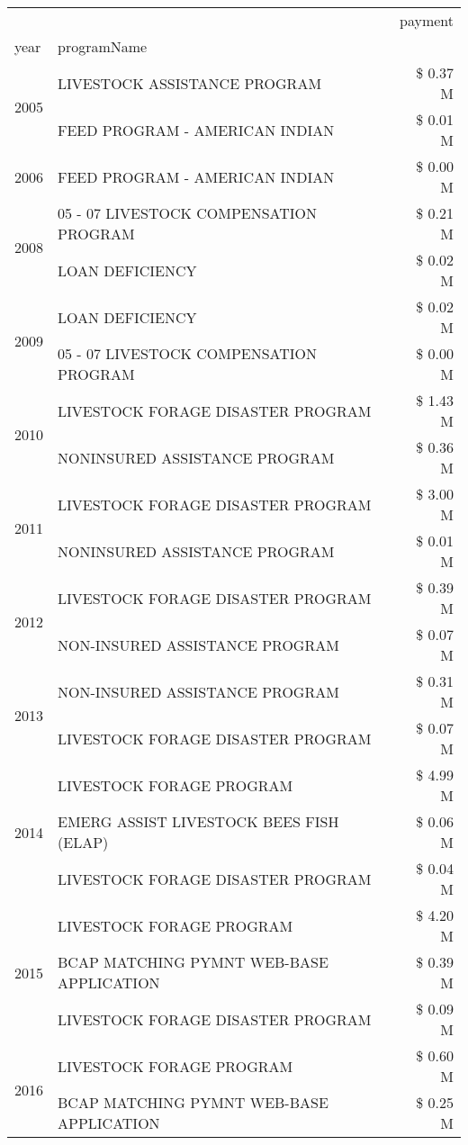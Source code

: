 \begin{tabular}{llr}
\toprule
 &  & payment \\
year & programName &  \\
\midrule
\multirow[t]{2}{*}{2005} & LIVESTOCK ASSISTANCE PROGRAM & \$ 0.37 M \\
 & FEED PROGRAM - AMERICAN INDIAN & \$ 0.01 M \\
\cline{1-3}
2006 & FEED PROGRAM - AMERICAN INDIAN & \$ 0.00 M \\
\cline{1-3}
\multirow[t]{2}{*}{2008} & 05 - 07 LIVESTOCK COMPENSATION PROGRAM & \$ 0.21 M \\
 & LOAN DEFICIENCY & \$ 0.02 M \\
\cline{1-3}
\multirow[t]{2}{*}{2009} & LOAN DEFICIENCY & \$ 0.02 M \\
 & 05 - 07 LIVESTOCK COMPENSATION PROGRAM & \$ 0.00 M \\
\cline{1-3}
\multirow[t]{2}{*}{2010} & LIVESTOCK FORAGE DISASTER PROGRAM & \$ 1.43 M \\
 & NONINSURED ASSISTANCE PROGRAM & \$ 0.36 M \\
\cline{1-3}
\multirow[t]{2}{*}{2011} & LIVESTOCK FORAGE DISASTER PROGRAM & \$ 3.00 M \\
 & NONINSURED ASSISTANCE PROGRAM & \$ 0.01 M \\
\cline{1-3}
\multirow[t]{2}{*}{2012} & LIVESTOCK FORAGE DISASTER PROGRAM & \$ 0.39 M \\
 & NON-INSURED ASSISTANCE PROGRAM & \$ 0.07 M \\
\cline{1-3}
\multirow[t]{2}{*}{2013} & NON-INSURED ASSISTANCE PROGRAM & \$ 0.31 M \\
 & LIVESTOCK FORAGE DISASTER PROGRAM & \$ 0.07 M \\
\cline{1-3}
\multirow[t]{3}{*}{2014} & LIVESTOCK FORAGE PROGRAM & \$ 4.99 M \\
 & EMERG ASSIST LIVESTOCK BEES FISH (ELAP) & \$ 0.06 M \\
 & LIVESTOCK FORAGE DISASTER PROGRAM & \$ 0.04 M \\
\cline{1-3}
\multirow[t]{3}{*}{2015} & LIVESTOCK FORAGE PROGRAM & \$ 4.20 M \\
 & BCAP MATCHING PYMNT WEB-BASE APPLICATION & \$ 0.39 M \\
 & LIVESTOCK FORAGE DISASTER PROGRAM & \$ 0.09 M \\
\cline{1-3}
\multirow[t]{3}{*}{2016} & LIVESTOCK FORAGE PROGRAM & \$ 0.60 M \\
 & BCAP MATCHING PYMNT WEB-BASE APPLICATION & \$ 0.25 M \\

\end{tabular}
